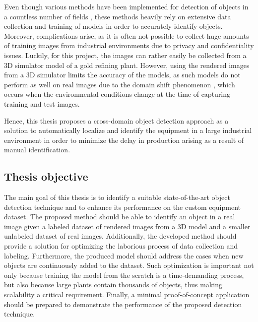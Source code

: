 Even though various methods have been implemented for detection of objects in a countless number of fields \cite{ima, Liu2015, He2017, Redmon2015a, Zhang2021b, Tian2019}, these methods heavily rely on extensive data collection and training of models in order to accurately identify objects. Moreover, complications arise, as it is often not possible to collect huge amounts of training images from industrial environments due to privacy and confidentiality issues. Luckily, for this project, the images can rather easily be collected from a 3D simulator model of a gold refining plant. However, using the rendered images from a 3D simulator limits the accuracy of the models, as such models do not perform as well on real images due to the domain shift phenomenon \cite{Ganin2015}, which occurs when the environmental conditions change at the time of capturing training and test images. 

Hence, this thesis proposes a cross-domain object detection approach as a solution to automatically localize and identify the equipment in a large industrial environment in order to minimize the delay in production arising as a result of manual identification. 


\clearpage

\subsection{Thesis objective}
\label{objective} 
The main goal of this thesis is to identify a suitable state-of-the-art object detection technique and to enhance its performance on the custom equipment dataset. The proposed method should be able to identify an object in a real image given a labeled dataset of rendered images from a 3D model and a smaller unlabeled dataset of real images. Additionally, the developed method should provide a solution for optimizing the laborious process of data collection and labeling. Furthermore, the produced model should address the cases when new objects are continuously added to the dataset.  Such optimization is important not only because training the model from the scratch is a time-demanding process, but also because large plants contain thousands of objects, thus making scalability a critical requirement. Finally, a minimal proof-of-concept application should be prepared to demonstrate the performance of the proposed detection technique.  

